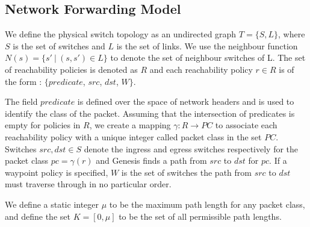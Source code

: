 \documentclass[]{sig}
\begin{document}
\subsection{Network Forwarding Model} \label{sec:fwdmodel}
We define the physical switch topology as an undirected graph $T=\{S, L\}$, where $S$ is the set of switches and $L$ is the set of links. We use the neighbour function $N(s) = \{s'\ | \ (s,s') \in L \}$ to denote the set of neighbour switches of L. The set of reachability policies is denoted as $R$ and each reachability policy $r \in R$ is of the form : $\{predicate$, $src$, $dst$, $W\}$. 

The field $predicate$ is defined over the space of network headers and is used to identify the class of the packet. Assuming that the intersection of predicates is empty for policies in $R$, we create a mapping $\gamma : R \rightarrow PC$ to associate each reachability policy with a unique integer called packet class in the set $PC$. Switches $src, dst \in S$ denote the ingress and egress switches respectively for the packet class $pc = \gamma(r)$ and Genesis finds a path from $src$ to $dst$ for $pc$. If a waypoint policy is specified, $W$ is the set of switches the path from $src$ to $dst$ must traverse through in no particular order.

We define a static integer $\mu$ to be the maximum path length for any packet class, and define the set $K = [0, \mu]$ to be the set of all permissible path lengths.
\end{document}
